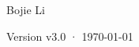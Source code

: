 \begin{titlepage}
\vfill
{\LARGE\sffamily Bojie Li\par}
\vspace{0.7cm}
{\small\sffamily\color{structurecolor!80} Version v3.0 · \today\par}
\vspace{1.2cm}
\end{titlepage}
